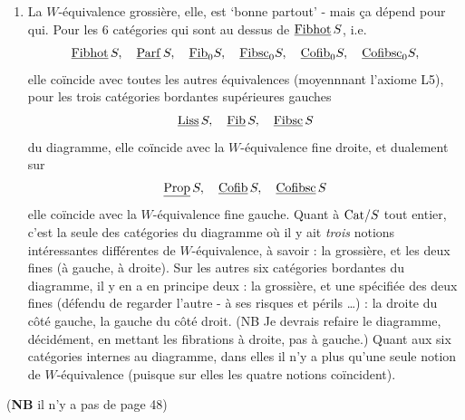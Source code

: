 
\begin{enumerate}[leftmargin=*]
\item[3)] La $W$-équivalence grossière, elle, est `bonne partout' - mais ça dépend pour qui. Pour les 6 catégories qui sont au dessus de $\underline{\mathrm{Fibhot}}\,S$, i.e.
\[
\underline{\mathrm{Fibhot}}\,S,\quad \underline{\mathrm{Parf}}\,S,\quad \underline{\mathrm{Fib}}_0S,\quad \underline{\mathrm{Fibsc}}_0S,\quad \underline{\mathrm{Cofib}}_0S,\quad \underline{\mathrm{Cofibsc}}_0S,
\]
elle coïncide avec toutes les autres équivalences (moyennnant l'axiome L5), pour les trois catégories bordantes supérieures gauches %
\[
\underline{\mathrm{Liss}}\,S,\quad \underline{\mathrm{Fib}}\,S,\quad \underline{\mathrm{Fibsc}}\,S
\]
du diagramme, elle coïncide avec la $W$-équivalence fine droite, et dualement sur
\[
\underline{\mathrm{Prop}}\,S,\quad \underline{\mathrm{Cofib}}\,S,\quad \underline{\mathrm{Cofibsc}}\,S
\]
elle coïncide avec la $W$-équivalence fine gauche. Quant à $\mathrm{Cat}/S$ tout entier, c'est la seule des catégories du diagramme où il y ait \textit{trois} notions intéressantes différentes de $W$-équivalence, à savoir : la grossière, et les deux fines (à gauche, à droite). Sur les autres six catégories bordantes du diagramme, il y en a en principe deux : la grossière, et une spécifiée des deux fines (défendu de regarder l'autre - à ses risques et périls \ldots) : la droite du côté gauche, la gauche du côté droit. (NB Je devrais refaire le diagramme, décidément, en mettant les fibrations à droite, pas à gauche.) Quant aux six catégories internes au diagramme, dans elles il n'y a plus qu'une seule notion de $W$-équivalence (puisque sur elles les quatre notions coïncident).
\end{enumerate}


 (\textbf{NB} il n'y a pas de page 48)


